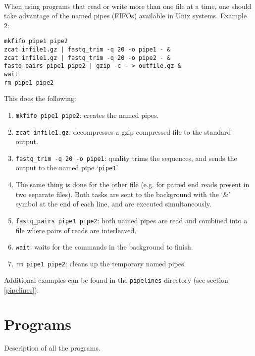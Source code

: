 \documentclass[a4paper,12pt]{article}
\begin{document}
\paragraph{}
When using programs that read or write more than one file at a time, one should take
advantage of the named pipes (FIFOs) available in Unix systems.
Example 2:
\begin{verbatim}
mkfifo pipe1 pipe2
zcat infile1.gz | fastq_trim -q 20 -o pipe1 - &
zcat infile1.gz | fastq_trim -q 20 -o pipe2 - &
fastq_pairs pipe1 pipe2 | gzip -c - > outfile.gz &
wait
rm pipe1 pipe2
\end{verbatim}
This does the following:
\begin{enumerate}
    \item \texttt{mkfifo pipe1 pipe2}: creates the named pipes.
    \item \texttt{zcat infile1.gz}: decompresses a gzip compressed file to the
        standard output.
    \item \texttt{fastq\_trim -q 20 -o pipe1}: quality trims the sequences, and
        sends the output to the named pipe `\texttt{pipe1}'
    \item The same thing is done for the other file (e.g. for paired end reads
        present in two separate files).  Both tasks are sent to the background
        with the `\&' symbol at the end of each line, and are executed
        simultaneously.
    \item \texttt{fastq\_pairs pipe1 pipe2}: both named pipes are read and
        combined into a file where pairs of reads are interleaved.
    \item \texttt{wait}: waits  for the commands in the background to finish.
    \item \texttt{rm pipe1 pipe2}: cleans up the temporary named pipes.
\end{enumerate}

Additional examples can be found in the \texttt{pipelines} directory (see
section \ref{pipelines}).


\section{Programs}

Description of all the programs.

\end{document}

